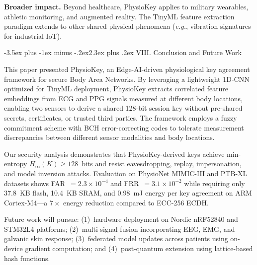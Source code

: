 \documentclass[10pt,twocolumn]{article}
\makeatletter
\renewcommand{\section}{\@startsection{section}{1}{\z@}%
  {-3.5ex plus -1ex minus -.2ex}{2.3ex plus .2ex}%
  {\normalfont\large\bfseries\centering}}
\newcommand{\eg}{\textit{e.g.}}
\makeatother
\begin{document}
\textbf{Broader impact.} Beyond healthcare, PhysioKey applies to military wearables, athletic monitoring, and augmented reality. The TinyML feature extraction paradigm extends to other shared physical phenomena (\eg, vibration signatures for industrial IoT).


\section{VIII. Conclusion and Future Work}
\label{sec:conclusion}

This paper presented PhysioKey, an Edge-AI-driven physiological key agreement framework for secure Body Area Networks. By leveraging a lightweight 1D-CNN optimized for TinyML deployment, PhysioKey extracts correlated feature embeddings from ECG and PPG signals measured at different body locations, enabling two sensors to derive a shared 128-bit session key without pre-shared secrets, certificates, or trusted third parties. The framework employs a fuzzy commitment scheme with BCH error-correcting codes to tolerate measurement discrepancies between different sensor modalities and body locations.

Our security analysis demonstrates that PhysioKey-derived keys achieve min-entropy $H_\infty(K) \geq 128$~bits and resist eavesdropping, replay, impersonation, and model inversion attacks. Evaluation on PhysioNet MIMIC-III and PTB-XL datasets shows FAR~$= 2.3 \times 10^{-4}$ and FRR~$= 3.1 \times 10^{-2}$ while requiring only 37.8~KB flash, 10.4~KB SRAM, and 0.98~mJ energy per key agreement on ARM Cortex-M4---a $7\times$ energy reduction compared to ECC-256 ECDH.

Future work will pursue: (1)~hardware deployment on Nordic nRF52840 and STM32L4 platforms; (2)~multi-signal fusion incorporating EEG, EMG, and galvanic skin response; (3)~federated model updates across patients using on-device gradient computation; and (4)~post-quantum extension using lattice-based hash functions.



\end{document}
